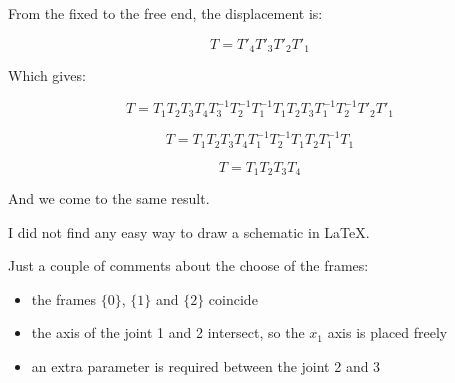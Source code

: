 \documentclass{exam}
\begin{document}
\begin{questions}
\begin{parts}
From the fixed to the free end, the displacement is:

\begin{equation}
  T = T'_{4}T'_{3}T'_{2}T'_{1}
\end{equation}

Which gives:

\begin{equation}
  T = T_{1}T_{2}T_{3}T_{4}T_{3}^{-1}T_{2}^{-1}T_{1}^{-1}
      T_{1}T_{2}T_{3}T_{1}^{-1}T_{2}^{-1}
      T'_{2}T'_{1}
\end{equation}

\begin{equation}
  T = T_{1}T_{2}T_{3}T_{4}T_{1}^{-1}T_{2}^{-1}
      T_{1}T_{2}T_{1}^{-1}    
      T_{1}
\end{equation}

\begin{equation}
  T = T_{1}T_{2}T_{3}T_{4}
\end{equation}

And we come to the same result.

\end{parts}

\question

I did not find any easy way to draw a schematic in LaTeX.

Just a couple of comments about the choose of the frames:

\begin{itemize}
  \item the frames $\{0\}$, $\{1\}$ and $\{2\}$ coincide
  \item the axis of the joint 1 and 2 intersect, so the $x_{1}$ axis is placed freely
  \item an extra parameter is required between the joint 2 and 3
\end{itemize}

\end{questions}
\end{document}
